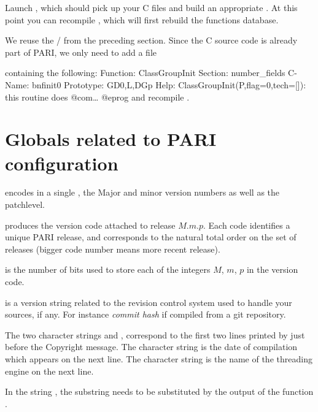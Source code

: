 \item Launch , which should pick up your C files and build an
appropriate . At this point you can recompile , which
will first rebuild the functions database.

 We reuse the  / 
from the preceding section. Since the C source code is already part
of PARI, we only need to add a file


\noindent containing the following:
\bprog
Function: ClassGroupInit
Section: number_fields
C-Name: bnfinit0
Prototype: GD0,L,DGp
Help: ClassGroupInit(P,{flag=0},{tech=[]}): this routine does @com\dots
@eprog\noindent
and recompile .

\section{Globals related to PARI configuration}

\noindent {} encodes in a single , the Major
and minor version numbers as well as the patchlevel.

 produces the version code
attached to release $M.m.p$. Each code identifies a unique PARI release,
and corresponds to the natural total order on the set of releases (bigger
code number means more recent release).

\noindent {} is the number of bits used to store each of
the integers $M$, $m$, $p$ in the version code.

\noindent {} is a version string related to the
revision control system used to handle your sources, if any. For instance
\emph{commit hash} if compiled from a git repository.

The two character strings  and ,
correspond to the first two lines printed by  just before the
Copyright message. The character string  is the
date of compilation which appears on the next line. The character string
 is the name of the threading engine on the next line.

In the string , the substring  needs
to be substituted by the output of the function .


